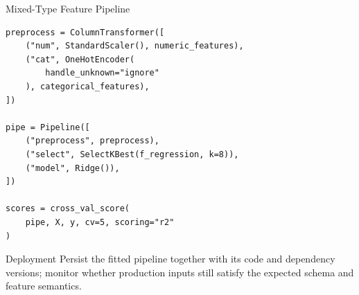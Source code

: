 \documentclass[aspectratio=169,11pt]{beamer}
\begin{document}
\begin{frame}[fragile]{Mixed-Type Feature Pipeline}
\begin{lstlisting}[style=code,basicstyle=\ttfamily\small]
preprocess = ColumnTransformer([
    ("num", StandardScaler(), numeric_features),
    ("cat", OneHotEncoder(
        handle_unknown="ignore"
    ), categorical_features),
])

pipe = Pipeline([
    ("preprocess", preprocess),
    ("select", SelectKBest(f_regression, k=8)),
    ("model", Ridge()),
])

scores = cross_val_score(
    pipe, X, y, cv=5, scoring="r2"
)
\end{lstlisting}

\begin{block}{Deployment}
Persist the fitted pipeline together with its code and dependency versions; monitor whether production inputs still satisfy the expected schema and feature semantics.
\end{block}
\end{frame}
\end{document}
